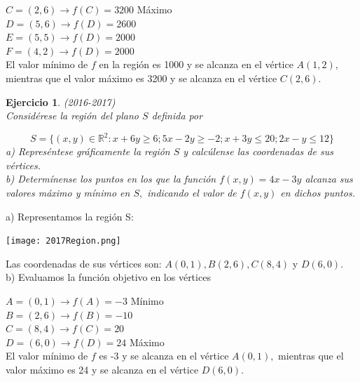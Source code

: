 \documentclass[12pt, a4paper]{amsart}
\newtheorem{ejer}{Ejercicio}
\newcommand{\s}{\color[rgb]{0,0,0.5}}
\newcommand{\n}{\color[rgb]{0,0,0}}
\begin{document}
$C=(2,6) \rightarrow f(C)=3200$ Máximo\\

$D=(5,6) \rightarrow f(D)=2600$\\

$E=(5,5) \rightarrow f(D)=2000$\\

$F=(4,2) \rightarrow f(D)=2000$\\

El valor mínimo de $f$ en la región es 1000 y se alcanza en el vértice $A(1,2),$ mientras que el valor máximo es 3200 y se alcanza en el vértice $C(2,6).$

\n

\begin{ejer}\em (2016-2017)\\
Considérese la región del plano $S$ definida por

\[
S=\{(x,y)\in \mathbb{R}^2: x+6y\geq 6; 5x-2y\geq -2; x+3y\leq 20; 2x-y\leq 12\}
\]
a) Represéntese gráficamente la región $S$ y calcúlense las coordenadas de sus vértices.\\
b) Determínense los puntos en los que la función $f (x, y) = 4x - 3y$ alcanza sus valores máximo y mínimo en $S,$ indicando el valor de $f (x, y)$ en dichos puntos.
\end{ejer}
\s


a) Representamos la región S:

\begin{center}
\texttt{[image: 2017Region.png]}
\end{center}



Las coordenadas de sus vértices son: $A(0,1), B(2,6), C(8,4)$ y $D(6,0).$\\

b) Evaluamos la función objetivo en los vértices
 
$A=(0,1) \rightarrow f(A)=-3$ Mínimo\\

$B=(2,6) \rightarrow f(B)=-10$\\

$C=(8,4) \rightarrow f(C)=20$\\

$D=(6,0) \rightarrow f(D)=24$ Máximo\\

El valor mínimo de $f$ es -3 y se alcanza en el vértice $A(0,1),$ mientras que el valor máximo es 24 y se alcanza en el vértice $D(6,0).$


\n
\end{document}

